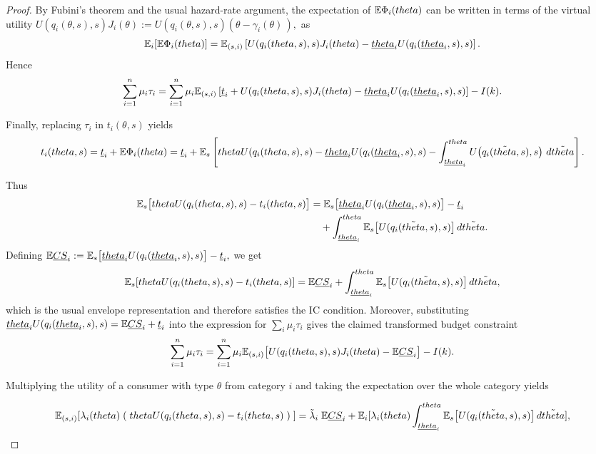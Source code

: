 \documentclass{class}
\begin{document}
\begin{proof}
By Fubini's theorem and the usual hazard-rate argument, the expectation of $\mathbb{E}\Phi_i(theta)$ can be written in terms of the virtual utility
$U(q_i(\theta,s),s) J_i(\theta) := U\!\left(q_i(\theta,s),s\right)(\theta - \gamma_i(\theta)\,),$
as
\[
\mathbb{E}_i[\mathbb{E}\Phi_i(theta)]
=
\mathbb{E}_{(s,i)}\left[
U(q_i(theta,s),s) J_i(theta)
- \underline{theta}_i U\!\left(q_i(\underline{theta}_i,s),s\right)
\right].
\]
Hence
\[
\sum_{i=1}^n \mu_i \tau_i
=
\sum_{i=1}^n \mu_i \mathbb{E}_{(s,i)}\left[
\underline t_i + U(q_i(theta,s),s) J_i(theta) - \underline{theta}_i U\!\left(q_i(\underline{theta}_i,s),s\right)
\right]
- I(k).
\]

Finally, replacing $\tau_i$ in $t_i(\theta,s)$ yields
\[
t_i(theta,s)
=
\underline t_i
+ \mathbb{E}\Phi_i(theta)
=
\underline t_i
+ \mathbb{E}_s\left[
theta U\!\left(q_i(theta,s),s\right)
- \underline{theta}_iU\!\left(q_i(\underline{theta}_i,s),s\right)
- \int_{\underline{theta}_i}^{theta}
U\!\left(q_i(\tilde{theta},s),s\right)\, d\tilde{theta}
\right].
\]

Thus
\begin{align*}
\mathbb{E}_s\big[theta U(q_i(theta,s),s) - t_i(theta,s)\big]
&=
\mathbb{E}_s\big[\underline{theta}_iU(q_i(\underline{theta}_i,s),s)\big]
- \underline t_i
\\
&\quad
+ \int_{\underline{theta}_i}^{theta}
\mathbb{E}_s\big[U(q_i(\tilde{theta},s),s)\big]\,d\tilde{theta}.
\end{align*}
Defining
$\mathbb{E}\underline{CS}_i := \mathbb{E}_s\big[\underline{theta}_iU(q_i(\underline{theta}_i,s),s)\big] - \underline t_i,$
we get
\[
\mathbb{E}_s[theta U(q_i(theta,s),s) - t_i(theta,s)]
=
\mathbb{E}\underline{CS}_i
+ \int_{\underline{theta}_i}^{theta}
\mathbb{E}_s\big[U(q_i(\tilde{theta},s),s)\big]\,d\tilde{theta},
\]
which is the usual envelope representation and therefore satisfies the IC condition. Moreover, substituting $\underline{theta}_iU(q_i(\underline{theta}_i,s),s) = \mathbb{E}\underline{CS}_i + \underline t_i$ into the expression for $\sum_i \mu_i \tau_i$ gives the claimed transformed budget constraint
\[
\sum_{i=1}^n \mu_i \tau_i
=
\sum_{i=1}^n \mu_i \mathbb{E}_{(s,i)}\big[ U(q_i(theta,s),s) J_i(theta) - \mathbb{E}\underline{CS}_i\big]
- I(k).
\]

Multiplying the utility of a consumer with type $\theta$ from category $i$ and taking the expectation over the whole category yields

\[
\mathbb{E}_{(s,i)}[\lambda_i(theta) \;( \;theta U(q_i(theta,s),s) - t_i(theta,s)\;)\;]
=
\tilde{\lambda}_i \; \mathbb{E}\underline{CS}_i
+ \mathbb{E}_i[\lambda_i(theta)\int_{\underline{theta}_i}^{theta}
\mathbb{E}_s\big[U(q_i(\tilde{theta},s),s)\big]\,d\tilde{theta}],
\]


\end{proof}
\end{document}
